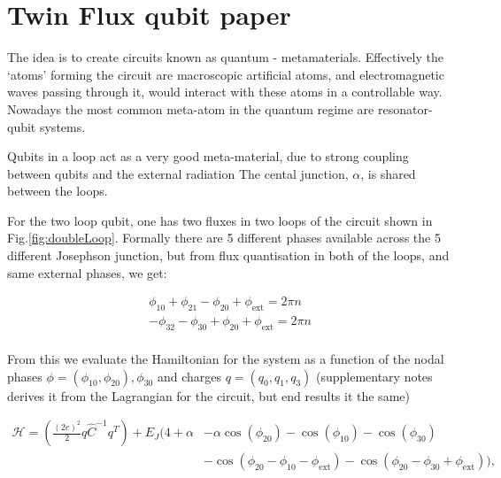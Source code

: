 
\section{Twin Flux qubit paper}

The idea is to create circuits known as quantum - metamaterials. Effectively the `atoms' forming the circuit are macroscopic artificial atoms, and electromagnetic waves passing through it, would interact with these atoms in a controllable way. Nowadays the most common meta-atom in the quantum regime are resonator-qubit systems.

Qubits in a loop act as a very good meta-material, due to strong coupling between qubits and the external radiation The cental junction, $ \alpha $, is shared between the loops. 

For the two loop qubit, one has two fluxes in two loops of the circuit shown in Fig.\ref{fig:doubleLoop}. Formally there are 5 different phases available across the 5 different Josephson junction, but from flux quantisation in both of the loops, and same external phases, we get:

\begin{equation}
\begin{aligned}
\phi_{10}+\phi_{21} - \phi_{20} + \phi_\text{ext} = 2\pi n\\
- \phi_{32} - \phi_{30} + \phi_{20} + \phi_\text{ext} = 2\pi n\\
\end{aligned}
\end{equation}

\noindent From this we evaluate the Hamiltonian for the system as a function of the nodal phases $ \phi = (\phi_{10}, \phi_{20}), \phi_{30} $ and charges $ q = (q_{0}, q_{1}, q_{3}) $ (supplementary notes derives it from the Lagrangian for the circuit, but end results it the same)

\begin{equation}
\begin{aligned}
	\mathcal{H} = (\frac{(2e)^2}{2}q\hat{C}^{-1}q^{T}) + E_J\bigg(4 + \alpha & - \alpha\cos(\phi_{20}) -\cos(\phi_{10}) -\cos(\phi_{30}) \\& - \cos(\phi_{20} - \phi_{10} - \phi_{\text{ext}}) - \cos(\phi_{20} - \phi_{30} + \phi_{\text{ext}})   \bigg),
\end{aligned}
\end{equation}

